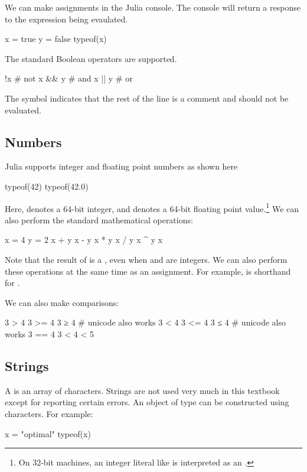 We can make assignments in the Julia console. The console will return a response to the expression being evaulated.
\begin{juliaconsole}
x = true
y = false
typeof(x)
\end{juliaconsole}

The standard Boolean operators are supported.
\begin{juliaconsole}
!x     # not
x && y # and
x || y # or
\end{juliaconsole}
The \jlv{#} symbol indicates that the rest of the line is a comment and should not be evaluated.

\subsection{Numbers}

Julia supports integer and floating point numbers as shown here
\begin{juliaconsole}
typeof(42)
typeof(42.0)
\end{juliaconsole}
Here,  denotes a 64-bit integer, and  denotes a 64-bit floating point value.\footnote{On 32-bit machines, an integer literal like  is interpreted as an .} We can also perform the standard mathematical operations:
\begin{juliaconsole}
x = 4
y = 2
x + y
x - y
x * y
x / y
x ^ y
x %
\end{juliaconsole}

Note that the result of  is a , even when  and  are integers.
We can also perform these operations at the same time as an assignment. For example,  is shorthand for .

We can also make comparisons:
\begin{juliaconsole}
3 > 4
3 >= 4
3 ≥ 4   # unicode also works
3 < 4
3 <= 4
3 ≤ 4   # unicode also works
3 == 4
3 < 4 < 5
\end{juliaconsole}

\subsection{Strings}

A  is an array of characters. Strings are not used very much in this textbook except for reporting certain errors. An object of type  can be constructed using  characters. For example:
\begin{juliaconsole}
x = "optimal"
typeof(x)
\end{juliaconsole}

